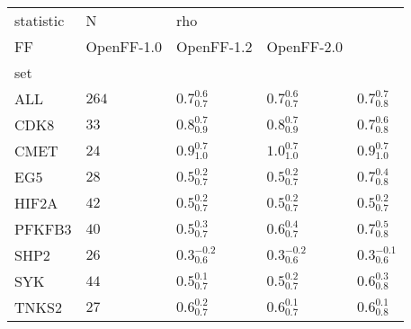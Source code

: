\begin{tabular}{lllll}
\toprule
statistic &      N & \multicolumn{3}{l}{rho} \\
FF &          OpenFF-1.0 &          OpenFF-1.2 &          OpenFF-2.0 \\
set    &        &                     &                     &                     \\
\midrule
ALL    &  $264$ &   $0.7^{0.6}_{0.7}$ &   $0.7^{0.6}_{0.7}$ &   $0.7^{0.7}_{0.8}$ \\
CDK8   &   $33$ &   $0.8^{0.7}_{0.9}$ &   $0.8^{0.7}_{0.9}$ &   $0.7^{0.6}_{0.8}$ \\
CMET   &   $24$ &   $0.9^{0.7}_{1.0}$ &   $1.0^{0.7}_{1.0}$ &   $0.9^{0.7}_{1.0}$ \\
EG5    &   $28$ &   $0.5^{0.2}_{0.7}$ &   $0.5^{0.2}_{0.7}$ &   $0.7^{0.4}_{0.8}$ \\
HIF2A  &   $42$ &   $0.5^{0.2}_{0.7}$ &   $0.5^{0.2}_{0.7}$ &   $0.5^{0.2}_{0.7}$ \\
PFKFB3 &   $40$ &   $0.5^{0.3}_{0.7}$ &   $0.6^{0.4}_{0.7}$ &   $0.7^{0.5}_{0.8}$ \\
SHP2   &   $26$ &  $0.3^{-0.2}_{0.6}$ &  $0.3^{-0.2}_{0.6}$ &  $0.3^{-0.1}_{0.6}$ \\
SYK    &   $44$ &   $0.5^{0.1}_{0.7}$ &   $0.5^{0.2}_{0.7}$ &   $0.6^{0.3}_{0.8}$ \\
TNKS2  &   $27$ &   $0.6^{0.2}_{0.7}$ &   $0.6^{0.1}_{0.7}$ &   $0.6^{0.1}_{0.8}$ \\
\bottomrule
\end{tabular}
